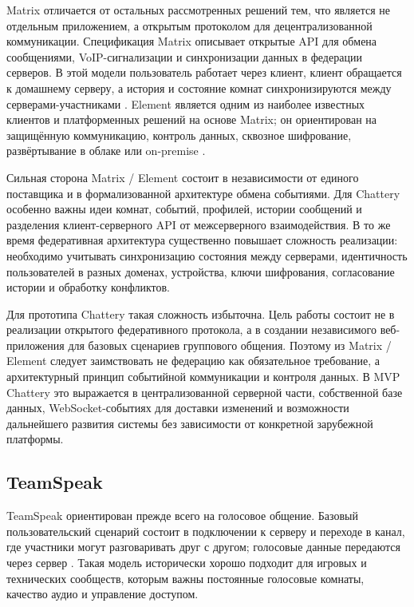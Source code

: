 \documentclass[a4paper,12pt]{extarticle}
\begin{document}
Matrix отличается от остальных рассмотренных решений тем, что является не отдельным приложением, а открытым протоколом для децентрализованной коммуникации. Спецификация Matrix описывает открытые API для обмена сообщениями, VoIP-сигнализации и синхронизации данных в федерации серверов. В этой модели пользователь работает через клиент, клиент обращается к домашнему серверу, а история и состояние комнат синхронизируются между серверами-участниками \cite{matrix}. Element является одним из наиболее известных клиентов и платформенных решений на основе Matrix; он ориентирован на защищённую коммуникацию, контроль данных, сквозное шифрование, развёртывание в облаке или on-premise \cite{element,element_privacy}.

Сильная сторона Matrix / Element состоит в независимости от единого поставщика и в формализованной архитектуре обмена событиями. Для Chattery особенно важны идеи комнат, событий, профилей, истории сообщений и разделения клиент-серверного API от межсерверного взаимодействия. В то же время федеративная архитектура существенно повышает сложность реализации: необходимо учитывать синхронизацию состояния между серверами, идентичность пользователей в разных доменах, устройства, ключи шифрования, согласование истории и обработку конфликтов.

Для прототипа Chattery такая сложность избыточна. Цель работы состоит не в реализации открытого федеративного протокола, а в создании независимого веб-приложения для базовых сценариев группового общения. Поэтому из Matrix / Element следует заимствовать не федерацию как обязательное требование, а архитектурный принцип событийной коммуникации и контроля данных. В MVP Chattery это выражается в централизованной серверной части, собственной базе данных, WebSocket-событиях для доставки изменений и возможности дальнейшего развития системы без зависимости от конкретной зарубежной платформы.

\subsection{TeamSpeak}

TeamSpeak ориентирован прежде всего на голосовое общение. Базовый пользовательский сценарий состоит в подключении к серверу и переходе в канал, где участники могут разговаривать друг с другом; голосовые данные передаются через сервер \cite{teamspeak}. Такая модель исторически хорошо подходит для игровых и технических сообществ, которым важны постоянные голосовые комнаты, качество аудио и управление доступом.
\end{document}
